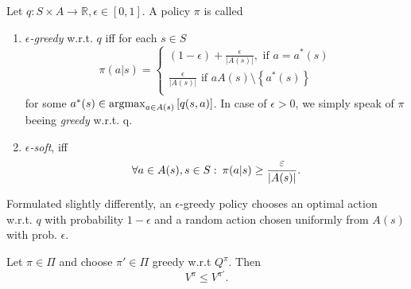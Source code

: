 \begin{definition}
    Let \( q: S \times A \to \mathbb{R}, \epsilon \in [0,1] \). A policy \( \pi \) is called 

    \begin{enumerate}
        \item \( \epsilon \)\emph{-greedy} w.r.t. \( q \) iff for each \( s \in S \)
        \[
            \pi(a|s) = \begin{cases}
                (1-\epsilon) + \frac{\epsilon}{|A(s)|}, \text{ if } a=a^*(s)\\
                \frac{\epsilon}{|A(s)|} \text{ if } a  A(s) \setminus \left\{ a^*(s) \right\}\\
            \end{cases}
        \]
        for some \( a^*(s) \in \operatorname*{argmax}_{ a \in A(s)} \left[ q(s,a) \right] \).
        In case of \( \epsilon> 0 \), we simply speak of \( \pi \) beeing \emph{greedy} w.r.t. q.
        \item \( \epsilon \)\emph{-soft}, iff
        \[
            \forall a \in A(s), s \in S:\: \pi(a|s) \geq \frac{\varepsilon}{|A(s)|}.
        \]
    \end{enumerate}
\end{definition}

Formulated slightly differently, an \( \epsilon \)-greedy policy chooses an optimal action w.r.t. \( q \) with probability \( 1-\epsilon \) and a random action  chosen uniformly from \( A(s) \) with prob. \( \epsilon \).

\begin{corollary}
         Let \( \pi \in \Pi \) and choose \( \pi' \in \Pi \) greedy w.r.t \( Q^\pi \). Then 
        \[
            V^\pi \leq V^{\pi'}.
        \]
\end{corollary}






















